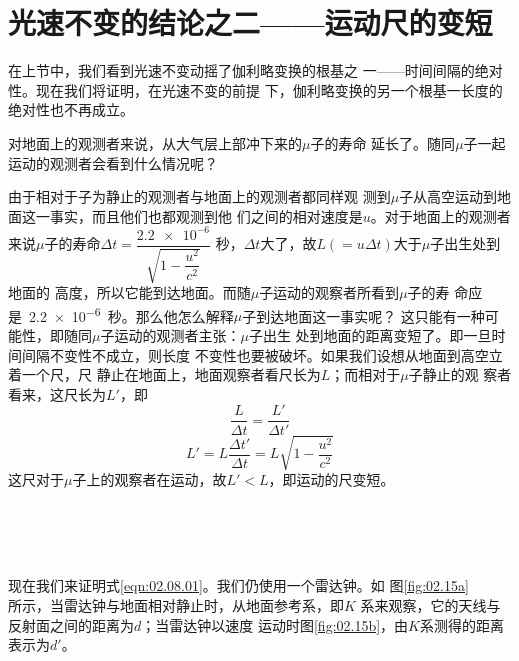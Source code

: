 \documentclass[../outline-of-mechanics.tex]{subfiles}
\begin{document}
\section{光速不变的结论之二——运动尺的变短}\label{sec:02.08}

在上节中，我们看到光速不变动摇了伽利略变换的根基之
一——时间间隔的绝对性。现在我们将证明，在光速不变的前提
下，伽利略变换的另一个根基一长度的绝对性也不再成立。

对地面上的观测者来说，从大气层上部冲下来的$ \mu $子的寿命
延长了。随同$ \mu $子一起运动的观测者会看到什么情况呢？

由于相对于子为静止的观测者与地面上的观测者都同样观
测到$ \mu $子从高空运动到地面这一事实，而且他们也都观测到他
们之间的相对速度是$u$。对于地面上的观测者来说$\mu$子的寿命$\Delta t = \dfrac{\num{2.2e-6}}{\sqrt{1 - \dfrac{u ^ 2}{c ^ 2}}}$
秒，$\Delta t$大了，故$ L \left( = u \Delta t \right)$大于$\mu$子出生处到地面的
高度，所以它能到达地面。而随$\mu$子运动的观察者所看到$\mu$子的寿
命应是~\num{2.2e-6}~秒。那么他怎么解释$\mu$子到达地面这一事实呢？
这只能有一种可能性，即随同$\mu$子运动的观测者主张：$\mu$子出生
处到地面的距离变短了。即一旦时间间隔不变性不成立，则长度
不变性也要被破坏。如果我们设想从地面到高空立着一个尺，尺
静止在地面上，地面观察者看尺长为$L$；而相对于$\mu$子静止的观
察者看来，这尺长为$L'$，即
\begin{equation*}
  \frac { L } { \Delta t } = \frac { L ' } { \Delta t ' }
\end{equation*}
\begin{equation}\label{eqn:02.08.01}
  L ' = L \frac { \Delta t ' } { \Delta t } = L \sqrt { 1 - \frac { u ^ { 2 } } { c ^ { 2 } } }
\end{equation}
这尺对于$\mu$子上的观察者在运动，故$ L ' < L $，即运动的尺变短。

\begin{figure}[!b]
  \centering
   \\ \vspace{-0.3em}
   \\ \vspace{-0.3em}
   \\ \vspace{-0.3em}
  \caption{}
  \label{fig:02.15}
\end{figure}
现在我们来证明式\eqref{eqn:02.08.01}。我们仍使用一个雷达钟。如
图\ref{fig:02.15a}\\所示，当雷达钟与地面相对静止时，从地面参考系，即$K$
系来观察，它的天线与反射面之间的距离为$ d$；当雷达钟以速度
运动时\lbr 图\ref{fig:02.15b}\rbr ，由$K$系测得的距离表示为$d'$。
\end{document}
